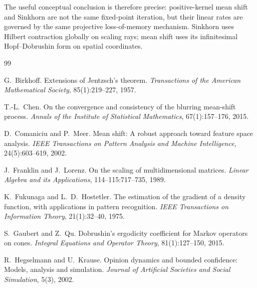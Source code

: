 \documentclass[11pt]{article}
\theoremstyle{definition}
\begin{document}
The useful conceptual conclusion is therefore precise: positive-kernel mean
shift and Sinkhorn are not the same fixed-point iteration, but their linear
rates are governed by the same projective loss-of-memory mechanism.  Sinkhorn
uses Hilbert contraction globally on scaling rays; mean shift uses its
infinitesimal Hopf--Dobrushin form on spatial coordinates.

\begin{thebibliography}{99}
\small
\setlength{\itemsep}{0pt}
\setlength{\parsep}{0pt}

G.~Birkhoff.
\newblock Extensions of Jentzsch's theorem.
\newblock \emph{Transactions of the American Mathematical Society},
85(1):219--227, 1957.

T.-L.~Chen.
\newblock On the convergence and consistency of the blurring mean-shift
process.
\newblock \emph{Annals of the Institute of Statistical Mathematics},
67(1):157--176, 2015.

D.~Comaniciu and P.~Meer.
\newblock Mean shift: A robust approach toward feature space analysis.
\newblock \emph{IEEE Transactions on Pattern Analysis and Machine
Intelligence}, 24(5):603--619, 2002.

J.~Franklin and J.~Lorenz.
\newblock On the scaling of multidimensional matrices.
\newblock \emph{Linear Algebra and its Applications}, 114--115:717--735,
1989.

K.~Fukunaga and L.~D.~Hostetler.
\newblock The estimation of the gradient of a density function, with
applications in pattern recognition.
\newblock \emph{IEEE Transactions on Information Theory}, 21(1):32--40,
1975.

S.~Gaubert and Z.~Qu.
\newblock Dobrushin's ergodicity coefficient for Markov operators on cones.
\newblock \emph{Integral Equations and Operator Theory}, 81(1):127--150,
2015.

R.~Hegselmann and U.~Krause.
\newblock Opinion dynamics and bounded confidence: Models, analysis and
simulation.
\newblock \emph{Journal of Artificial Societies and Social Simulation},
5(3), 2002.

\end{thebibliography}
\end{document}
